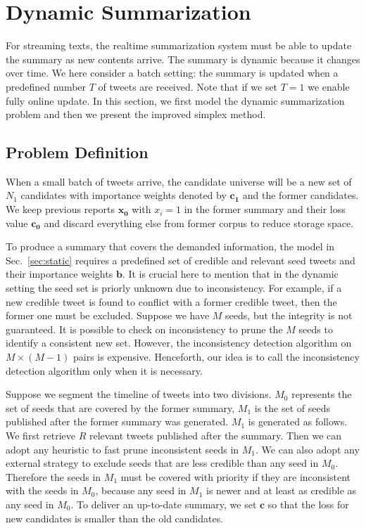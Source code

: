 \documentclass[envcountsame]{llncs}
\begin{document}
\section{Dynamic Summarization}\label{sec:dynamic}
For streaming texts, the realtime summarization system must be able to update the summary as new contents arrive. The summary is dynamic because it changes over time. We here consider a batch setting: the summary is updated when a predefined number $T$ of tweets are received. Note that if we set $T=1$ we enable fully online update.  In this section, we first model the dynamic summarization problem and then we present the improved simplex method.

\subsection{Problem Definition}
When a small batch of tweets arrive, the candidate universe will be a new set of $N_1 $ candidates with importance weights denoted by $\mathbf{c_1}$ and the former candidates. We keep previous reports $\mathbf{x_0}$ with $x_i=1$ in the former summary and their loss value $\mathbf{c_0}$  and discard everything else from former corpus to reduce storage space.

To produce a summary that covers the demanded information, the model in Sec.~\ref{sec:static} requires a predefined set of credible and relevant seed tweets and their importance weights $\mathbf{b}$. It is crucial here to mention that in the dynamic setting the seed set is priorly unknown due to inconsistency. For example, if a new credible tweet is found to conflict with a former credible tweet, then the former one must be excluded. Suppose we have $M$ seeds, but the integrity is not guaranteed. It is possible to check on inconsistency to prune the $M$ seeds to identify a consistent new set. However, the inconsistency detection algorithm on $M\times (M-1)$ pairs is expensive. Henceforth, our idea is to call the inconsistency detection algorithm only when it is necessary.

Suppose we segment the timeline of tweets into two divisions. $M_0$ represents the set of seeds that are covered by the former summary, $M_1$ is the set of seeds published after the former summary was generated. $M_1$ is generated as follows. We first retrieve $R$ relevant tweets published after the summary. Then we can adopt any heuristic to fast prune inconsistent seeds in $M_1$. We can also adopt any external strategy to exclude seeds that are less credible than any seed in $M_0$. Therefore the seeds in $M_1$ must be covered with priority if they are inconsistent with the seeds in $M_0$, because any seed in  $M_1$ is newer and at least as credible as any seed in $M_0$.  To deliver an up-to-date summary, we set $\mathbf{c}$ so that the loss for new candidates is smaller than the old candidates.
\end{document}
